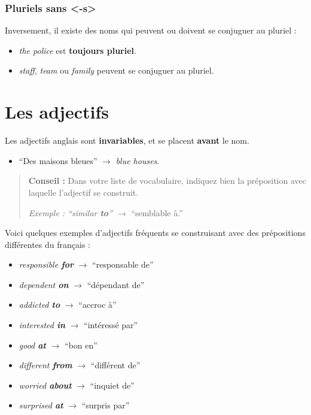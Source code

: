 \documentclass[
  10pt,
]{article}
\providecommand{\tightlist}{%
  \setlength{\itemsep}{0pt}\setlength{\parskip}{0pt}}
\begin{document}
\hypertarget{pluriels-sans--s}{%
\subsubsection{Pluriels sans \textless-s\textgreater{}}\label{pluriels-sans--s}}

Inversement, il existe des noms qui peuvent ou doivent se conjuguer au pluriel :

\begin{itemize}
\tightlist
\item
  \color[HTML]{f44336}\emph{the police} \color{black} est \textbf{toujours pluriel}.
\item
  \emph{staff}, \emph{team} ou \emph{family} peuvent se conjuguer au pluriel.
\end{itemize}

\hypertarget{les-adjectifs}{%
\section{Les adjectifs}\label{les-adjectifs}}

Les adjectifs anglais sont \textbf{invariables}, et se placent \textbf{avant} le nom.

\begin{itemize}
\tightlist
\item
  ``Des maisons bleues'' \(\rightarrow\) \emph{blue houses}.
\end{itemize}

\begin{quote}
\textbf{Conseil :} Dans votre liste de vocabulaire, indiquez bien la préposition avec laquelle l'adjectif se construit.

\emph{Exemple : ``similar \textbf{to}'' \(\rightarrow\)} ``semblable à.''
\end{quote}

Voici quelques exemples d'adjectifs fréquents se construisant avec des prépositions différentes du français :

\begin{itemize}
\tightlist
\item
  \emph{responsible \textbf{for}} \(\rightarrow\) ``responsable de''
\item
  \emph{dependent \textbf{on}} \(\rightarrow\) ``dépendant de''
\item
  \emph{addicted \textbf{to}} \(\rightarrow\) ``accroc à''
\item
  \emph{interested \textbf{in}} \(\rightarrow\) ``intéressé par''
\item
  \emph{good \textbf{at}} \(\rightarrow\) ``bon en''
\item
  \emph{different \textbf{from}} \(\rightarrow\) ``différent de''
\item
  \emph{worried \textbf{about}} \(\rightarrow\) ``inquiet de''
\item
  \emph{surprised \textbf{at}} \(\rightarrow\) ``surpris par''
\end{itemize}
\end{document}
